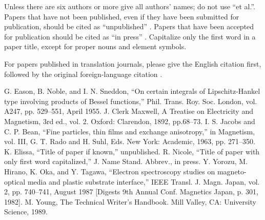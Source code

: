 \documentclass[conference]{IEEEtran}
\begin{document}
Unless there are six authors or more give all authors' names; do not use 
``et al.''. Papers that have not been published, even if they have been 
submitted for publication, should be cited as ``unpublished'' \cite{b4}. Papers 
that have been accepted for publication should be cited as ``in press'' \cite{b5}. 
Capitalize only the first word in a paper title, except for proper nouns and 
element symbols.

For papers published in translation journals, please give the English 
citation first, followed by the original foreign-language citation \cite{b6}.

\begin{thebibliography}{00}
 G. Eason, B. Noble, and I. N. Sneddon, ``On certain integrals of Lipschitz-Hankel type involving products of Bessel functions,'' Phil. Trans. Roy. Soc. London, vol. A247, pp. 529--551, April 1955.
 J. Clerk Maxwell, A Treatise on Electricity and Magnetism, 3rd ed., vol. 2. Oxford: Clarendon, 1892, pp.68--73.
 I. S. Jacobs and C. P. Bean, ``Fine particles, thin films and exchange anisotropy,'' in Magnetism, vol. III, G. T. Rado and H. Suhl, Eds. New York: Academic, 1963, pp. 271--350.
 K. Elissa, ``Title of paper if known,'' unpublished.
 R. Nicole, ``Title of paper with only first word capitalized,'' J. Name Stand. Abbrev., in press.
 Y. Yorozu, M. Hirano, K. Oka, and Y. Tagawa, ``Electron spectroscopy studies on magneto-optical media and plastic substrate interface,'' IEEE Transl. J. Magn. Japan, vol. 2, pp. 740--741, August 1987 [Digests 9th Annual Conf. Magnetics Japan, p. 301, 1982].
 M. Young, The Technical Writer's Handbook. Mill Valley, CA: University Science, 1989.
\end{thebibliography}
\end{document}
